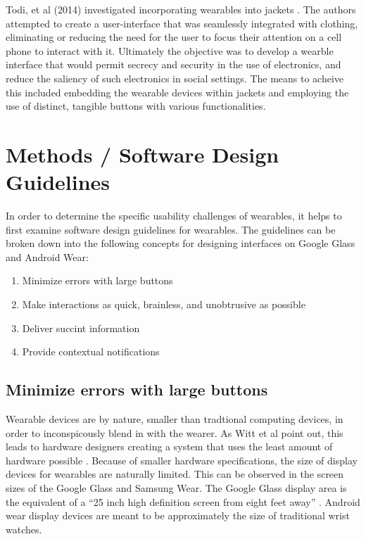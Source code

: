 \documentclass[12pt]{article}
\begin{document}
Todi, et al (2014) investigated incorporating wearables into jackets \cite{todi}. The authors attempted to create a user-interface that was seamlessly integrated with clothing, eliminating or reducing the need for the user to focus their attention on a cell phone to interact with it. Ultimately the objective was to develop a wearble interface that would permit secrecy and security in the use of electronics, and reduce the saliency of such electronics in social settings.  The means to acheive this included embedding the wearable devices within jackets and employing the use of distinct, tangible buttons with various functionalities.

\section{Methods / Software Design Guidelines} 

In order to determine the specific usability challenges of wearables, it helps to first examine software design guidelines for wearables. The guidelines can be broken down into the following concepts for designing interfaces on Google Glass and Android Wear:

\begin{enumerate}
\item{Minimize errors with large buttons}
\item{Make interactions as quick, brainless, and unobtrusive as possible}
\item{Deliver succint information}
\item{Provide contextual notifications}
\end{enumerate}

\subsection{Minimize errors with large buttons}
Wearable devices are by nature, smaller than tradtional computing devices, in order to inconspicously blend in with the wearer. As Witt et al point out, this leads to hardware designers creating a system that uses the least amount of hardware possible \cite{witt}. Because of smaller hardware specifications, the size of display devices for wearables are naturally limited. This can be observed in the screen sizes of the Google Glass and Samsung Wear. The Google Glass display area is the equivalent of a ``25 inch high definition screen from eight feet away'' \cite{goog2}. Android wear display devices are meant to be approximately the size of traditional wrist watches.
\end{document}

